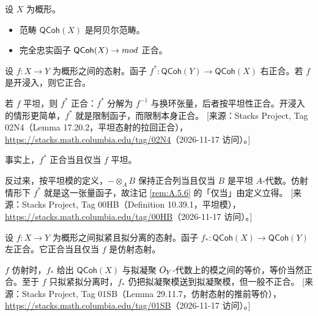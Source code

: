 \begin{proposition}\label{prop:A.5.4}
设 $X$ 为概形。
\begin{itemize}[leftmargin=2em,itemsep=0.25ex]
  \item 范畴 $\mathsf{QCoh}(X)$ 是阿贝尔范畴。
  \item 完全忠实函子 $\mathsf{QCoh}(X)\to mod$ 正合。
\end{itemize}
\end{proposition}

\begin{proposition}\label{prop:A.5.5}
设 $f:X\to Y$ 为概形之间的态射。函子 $f^*:\mathsf{QCoh}(Y)\to\mathsf{QCoh}(X)$ 右正合。若 $f$ 是开浸入，则它正合。
\end{proposition}

\begin{yizhu}
若 $f$ 平坦，则 $f^*$ 正合：$f^*$ 分解为 $f^{-1}$ 与换环张量，后者按平坦性正合。开浸入的情形更简单，$f^*$ 就是限制函子，而限制本身正合。
[来源：Stacks Project, Tag 02N4（Lemma 17.20.2，平坦态射的拉回正合），\url{https://stacks.math.columbia.edu/tag/02N4}（2026-11-17 访问）。]
\end{yizhu}

\begin{remark}\label{rem:A.5.6}
事实上，$f^*$ 正合当且仅当 $f$ 平坦。
\end{remark}

\begin{yizhu}
反过来，按平坦模的定义，$-\otimes_A B$ 保持正合列当且仅当 $B$ 是平坦 $A$-代数。仿射情形下 $f^*$ 就是这一张量函子，故注记 \ref{rem:A.5.6} 的「仅当」由定义立得。
[来源：Stacks Project, Tag 00HB（Definition 10.39.1，平坦模），\url{https://stacks.math.columbia.edu/tag/00HB}（2026-11-17 访问）。]
\end{yizhu}

\begin{proposition}\label{prop:A.5.7}
设 $f:X\to Y$ 为概形之间拟紧且拟分离的态射。函子 $f_*:\mathsf{QCoh}(X)\to\mathsf{QCoh}(Y)$ 左正合。它正合当且仅当 $f$ 是仿射态射。
\end{proposition}

\begin{yizhu}
$f$ 仿射时，$f_*$ 给出 $\mathsf{QCoh}(X)$ 与拟凝聚 $O_Y$-代数上的模之间的等价，等价当然正合。至于 $f$ 只拟紧拟分离时，$f_*$ 仍把拟凝聚模送到拟凝聚模，但一般不正合。
[来源：Stacks Project, Tag 01SB（Lemma 29.11.7，仿射态射的推前等价），\url{https://stacks.math.columbia.edu/tag/01SB}（2026-11-17 访问）。]
\end{yizhu}
